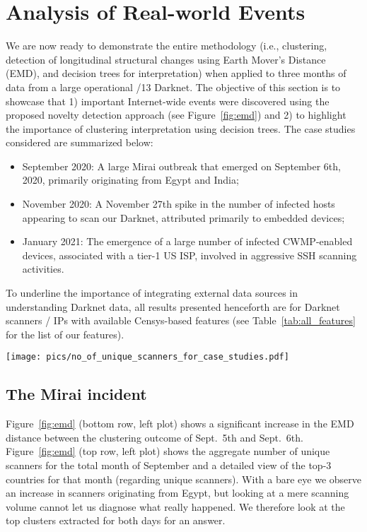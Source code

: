 \documentclass[manuscript, nonacm]{acmart}
\begin{document}
\section{Analysis of Real-world Events}
\label{sec:real}

We are now ready to demonstrate the entire methodology 
(i.e., clustering, detection of longitudinal structural changes using Earth Mover's Distance (EMD),
and decision trees for interpretation) when applied to three months of
data from a large operational /13 Darknet. The objective 
of this section is to showcase that 1) important Internet-wide
events were discovered using the proposed novelty detection
approach (see Figure~\ref{fig:emd}) and 2) to
highlight the importance of clustering interpretation using
decision trees. The case studies considered are summarized below:
\begin{itemize}
    \item September 2020: A large Mirai outbreak that emerged on September 6th, 2020, primarily originating from Egypt and India;
    \item November 2020: A November 27th spike in the number of infected hosts appearing to scan our Darknet, attributed primarily to embedded devices;
    \item January 2021: The emergence of a large number of infected CWMP-enabled devices, associated with a tier-1 US ISP, involved in aggressive SSH scanning activities.
\end{itemize}

To underline the importance of integrating external data sources in understanding Darknet data,
all results presented henceforth are for Darknet scanners / IPs with available Censys-based features
(see Table~\ref{tab:all_features} for the list of our features).

\begin{figure*}[ht]
    \centering
    \texttt{[image: pics/no\_of\_unique\_scanners\_for\_case\_studies.pdf]}
    \caption{Diagnosing temporal clustering changes using Earth Mover's Distance.}
    \label{fig:emd}
\end{figure*}

\subsection{The Mirai incident}

Figure~\ref{fig:emd} (bottom row, left plot) shows a significant increase in the EMD distance between the clustering
outcome of Sept.\ 5th and Sept.\ 6th. Figure~\ref{fig:emd} (top row, left plot) shows the aggregate number of unique scanners
for the total month of September and a detailed view of the top-3 countries for that month (regarding unique scanners).
With a bare eye we observe an increase in scanners originating from Egypt, but looking at a mere scanning volume
cannot let us diagnose what really happened. We therefore look at the top clusters extracted for both days
for an answer.
\end{document}
